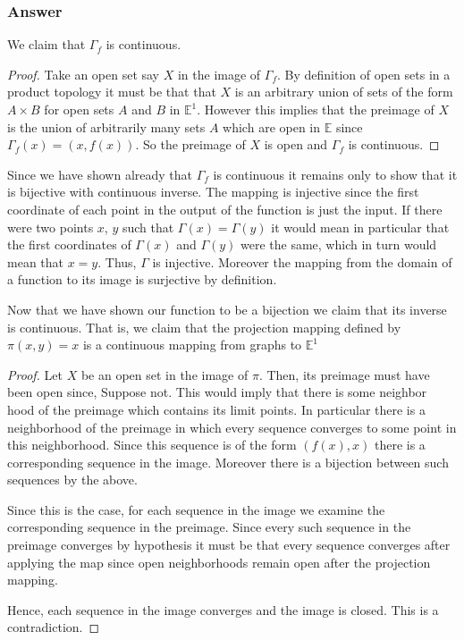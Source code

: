 \documentclass[10pt]{article}
\begin{document}
\subsubsection{Answer}
We claim that $\Gamma_f $ is continuous.

\begin{proof}
Take an open set say $X$ in the image of $\Gamma_f$. By definition of open sets in a product topology it must be that that $X$ is an arbitrary union of sets of the form $A \times B$ for open sets $A$ and $B$ in $\mathbb{E}^1$. However this implies that the preimage of $X$ is the union of arbitrarily many sets $A$ which are open in $\mathbb{E}$ since  $\Gamma_f(x) = (x,f(x))$. So the preimage of $X$ is open and $\Gamma_f$ is continuous.
\end{proof}

Since we have shown already that $\Gamma_f$ is continuous it remains only to show that it is bijective with continuous inverse. The mapping is injective since the first coordinate of each point in the output of the function is just the input. If there were two points $x$, $y$ such that $\Gamma(x)= \Gamma(y)$ it would mean in particular that the first coordinates of $\Gamma(x) $ and $\Gamma(y)$ were the same, which in turn would mean that $x=y$. Thus, $\Gamma$ is injective. Moreover the mapping from the domain of a function to its image is surjective by definition. 

Now that we have shown our function to be a bijection we claim that its inverse is continuous. That is, we claim that the projection mapping defined by $\pi(x,y) = x$
 is  a continuous mapping from graphs to $\mathbb{E}^1$
 
 \begin{proof}
Let $X$ be an open set in the image of $\pi$. Then, its preimage must have been open since,
Suppose  not. This would imply that there is some neighbor hood of the preimage which contains its limit points. In particular there is a neighborhood of the preimage in which every sequence converges to some point in this neighborhood. Since this sequence is of the form $(f(x),x)$ there is a corresponding sequence in the image. Moreover there is a bijection between such sequences by the above.

Since this is the case, for each sequence in the image we examine the corresponding sequence in the preimage. Since every such sequence in the preimage converges by hypothesis it must be that every sequence converges after applying the map since open neighborhoods remain open after the projection mapping. 

Hence, each sequence in the image converges and the image is closed. This is a contradiction.
\end{proof} 
\end{document}
